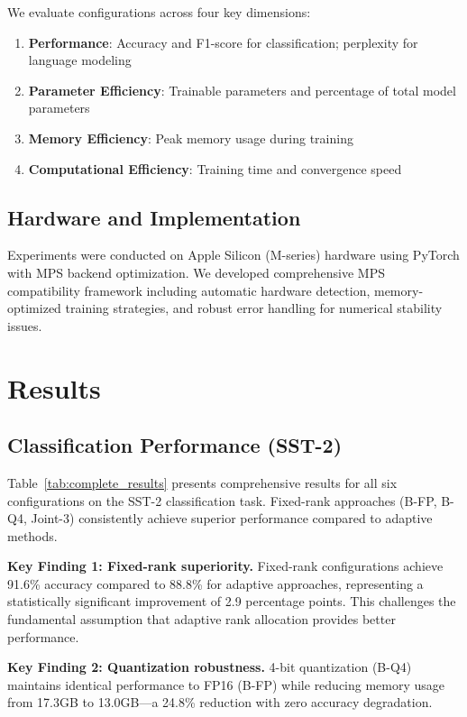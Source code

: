 \documentclass[11pt,a4paper]{article}
\begin{document}
We evaluate configurations across four key dimensions:
\begin{enumerate}
    \item \textbf{Performance}: Accuracy and F1-score for classification; perplexity for language modeling
    \item \textbf{Parameter Efficiency}: Trainable parameters and percentage of total model parameters
    \item \textbf{Memory Efficiency}: Peak memory usage during training
    \item \textbf{Computational Efficiency}: Training time and convergence speed
\end{enumerate}

\subsection{Hardware and Implementation}

Experiments were conducted on Apple Silicon (M-series) hardware using PyTorch with MPS backend optimization. We developed comprehensive MPS compatibility framework including automatic hardware detection, memory-optimized training strategies, and robust error handling for numerical stability issues.

\section{Results}

\subsection{Classification Performance (SST-2)}

Table~\ref{tab:complete_results} presents comprehensive results for all six configurations on the SST-2 classification task. Fixed-rank approaches (B-FP, B-Q4, Joint-3) consistently achieve superior performance compared to adaptive methods.



\textbf{Key Finding 1: Fixed-rank superiority.} Fixed-rank configurations achieve 91.6\% accuracy compared to 88.8\% for adaptive approaches, representing a statistically significant improvement of 2.9 percentage points. This challenges the fundamental assumption that adaptive rank allocation provides better performance.

\textbf{Key Finding 2: Quantization robustness.} 4-bit quantization (B-Q4) maintains identical performance to FP16 (B-FP) while reducing memory usage from 17.3GB to 13.0GB—a 24.8\% reduction with zero accuracy degradation.
\end{document}
